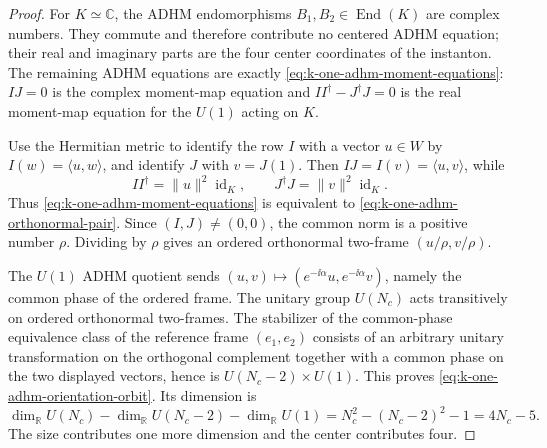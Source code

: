 \begin{proof}
For \(K\simeq\mathbb C\), the ADHM endomorphisms \(B_1,B_2\in
\operatorname{End}(K)\) are complex numbers.  They commute and therefore
contribute no centered ADHM equation; their real and imaginary parts are the
four center coordinates of the instanton.  The remaining ADHM equations are
exactly \eqref{eq:k-one-adhm-moment-equations}: \(IJ=0\) is the complex
moment-map equation and \(II^\dagger-J^\dagger J=0\) is the real moment-map
equation for the \(U(1)\) acting on \(K\).

Use the Hermitian metric to identify the row \(I\) with a vector \(u\in W\)
by \(I(w)=\langle u,w\rangle\), and identify \(J\) with \(v=J(1)\).  Then
\(IJ=I(v)=\langle u,v\rangle\), while
\[
  II^\dagger=\|u\|^2\operatorname{id}_{K},
  \qquad
  J^\dagger J=\|v\|^2\operatorname{id}_{K}.
\]
Thus \eqref{eq:k-one-adhm-moment-equations} is equivalent to
\eqref{eq:k-one-adhm-orthonormal-pair}.  Since \((I,J)\ne(0,0)\), the common
norm is a positive number \(\rho\).  Dividing by \(\rho\) gives an ordered
orthonormal two-frame \((u/\rho,v/\rho)\).

The \(U(1)\) ADHM quotient sends
\((u,v)\mapsto(e^{-\ii\alpha}u,e^{-\ii\alpha}v)\), namely the common phase of
the ordered frame.  The unitary group \(U(N_c)\) acts transitively on ordered
orthonormal two-frames.  The stabilizer of the common-phase equivalence class
of the reference frame \((e_1,e_2)\) consists of an arbitrary unitary
transformation on the orthogonal complement together with a common phase on
the two displayed vectors, hence is \(U(N_c-2)\times U(1)\).  This proves
\eqref{eq:k-one-adhm-orientation-orbit}.  Its dimension is
\[
  \dim_\mathbb R U(N_c)
  -
  \dim_\mathbb R U(N_c-2)
  -
  \dim_\mathbb R U(1)
  =
  N_c^2-(N_c-2)^2-1
  =
  4N_c-5 .
\]
The size contributes one more dimension and the center contributes four.
\end{proof}

